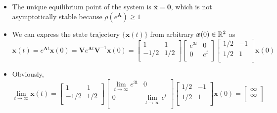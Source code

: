 \documentclass[12pt,a4paper]{article}
\begin{document}
\begin{itemize}
\begin{itemize}
  \item The unique equilibrium point of the system is $\bar{\bm{x}}=\bm{0}$,
    which is not asymptotically stable because $\rho(e^{\bm{A}})\geq 1$

  \item We can express the state trajectory $\{\bm{x}(t)\}$ from arbitrary $\bm{x}(0)\in \mathbb{R}^{2}$ as
      \begin{equation}\nonumber%
        \bm{x}(t) =
        e^{\bm{A}t}\bm{x}(0)
        =
        \bm{V}e^{\bm{\Lambda}t}\bm{V}^{-1}\bm{x}(0)
        =
      \begin{bmatrix}
        1 & 1 \\
        -1/2 & 1/2 \\
      \end{bmatrix}
      \begin{bmatrix}
        e^{3t} & 0 \\
        0 & e^{t} \\
      \end{bmatrix}
      \begin{bmatrix}
        1/2 & -1 \\
        1/2 & 1 \\
      \end{bmatrix}
      \bm{x}(0)
    \end{equation}
  \item Obviously,
    \begin{equation}\nonumber%
      \lim_{t\to \infty}\bm{x}(t) =
      \begin{bmatrix}
        1 & 1 \\
        -1/2 & 1/2 \\
      \end{bmatrix}
      \begin{bmatrix}
        \lim_{t\to\infty}e^{3t} & 0 \\
        0 & \lim_{t\to\infty}e^{t} \\
      \end{bmatrix}
      \begin{bmatrix}
        1/2 & -1 \\
        1/2 & 1 \\
      \end{bmatrix}
      \bm{x}(0)
      =
      \begin{bmatrix}
        \infty \\
        \infty \\
      \end{bmatrix}
    \end{equation}

\end{itemize}
\end{itemize}
\end{document}
